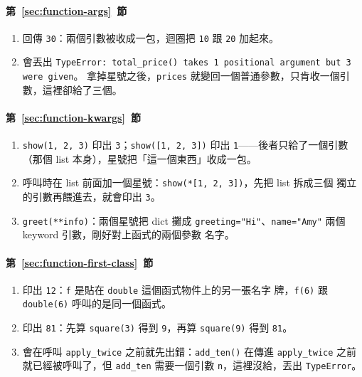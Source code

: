 \paragraph{第~\ref{sec:function-args}~節}
\begin{enumerate}
\item 回傳 \texttt{30}：兩個引數被收成一包，迴圈把 \texttt{10} 跟 \texttt{20} 加起來。
\item 會丟出 \texttt{TypeError: total\_price() takes 1 positional argument but 3 were given}。
拿掉星號之後，\texttt{prices} 就變回一個普通參數，只肯收一個引數，這裡卻給了三個。
\end{enumerate}

\paragraph{第~\ref{sec:function-kwargs}~節}
\begin{enumerate}
\item \texttt{show(1, 2, 3)} 印出 \texttt{3}；\texttt{show([1, 2, 3])} 印出
\texttt{1}——後者只給了一個引數（那個 list 本身），星號把「這一個東西」收成一包。
\item 呼叫時在 list 前面加一個星號：\texttt{show(*[1, 2, 3])}，先把 list 拆成三個
獨立的引數再餵進去，就會印出 \texttt{3}。
\item \texttt{greet(**info)}：兩個星號把 dict 攤成
\texttt{greeting="Hi"}、\texttt{name="Amy"} 兩個 keyword 引數，剛好對上函式的兩個參數
名字。
\end{enumerate}

\paragraph{第~\ref{sec:function-first-class}~節}
\begin{enumerate}
\item 印出 \texttt{12}：\texttt{f} 是貼在 \texttt{double} 這個函式物件上的另一張名字
牌，\texttt{f(6)} 跟 \texttt{double(6)} 呼叫的是同一個函式。
\item 印出 \texttt{81}：先算 \texttt{square(3)} 得到 \texttt{9}，再算
\texttt{square(9)} 得到 \texttt{81}。
\item 會在呼叫 \texttt{apply\_twice} 之前就先出錯：\texttt{add\_ten()} 在傳進
\texttt{apply\_twice} 之前就已經被呼叫了，但 \texttt{add\_ten} 需要一個引數
\texttt{n}，這裡沒給，丟出 \texttt{TypeError}。
\end{enumerate}

